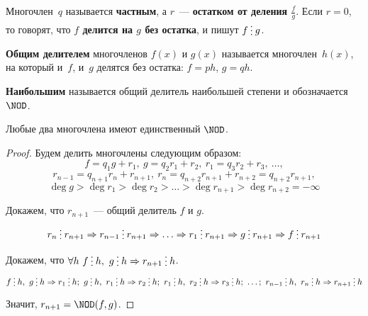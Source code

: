 Многочлен~$q$ называется \textbf{частным}, а $r$~--- \textbf{остатком от деления $\frac{f}g$}.
Если $r = 0$, то говорят, что \textbf{$f$ делится на $g$ без остатка}, и пишут $f \mult g$.

\textbf{Общим делителем} многочленов $f(x)$ и $g(x)$ называется многочлен~$h(x)$, на который и~$f$, и~$g$ делятся без остатка: $f = ph$, $g = qh$.

\textbf{Наибольшим} называется общий делитель наибольшей степени и обозначается $\NOD$.

\begin{theorem}
Любые два многочлена имеют единственный $\NOD$.
\end{theorem}
\begin{proof}
Будем делить многочлены следующим образом:
\begin{equation*}
f = q_1 g + r_1, \
g = q_2 r_1 + r_2, \
r_1 = q_3 r_2 + r_3, \ \ldots,
\end{equation*}
\begin{equation*}
r_{n-1} = q_{n+1} r_n + r_{n+1}, \
r_n = q_{n+2} r_{n+1} + r_{n+2} = q_{n+2} r_{n+1},
\end{equation*}
\begin{equation*}
\deg g > \deg r_1 > \deg r_2 > \ldots > \deg r_{n+1} > \deg r_{n+2} = -\infty
\end{equation*}

Докажем, что $r_{n+1}$~--- общий делитель $f$ и $g$.
\begin{equation*}
r_n \mult r_{n+1} \Rightarrow
r_{n-1} \mult r_{n+1} \Rightarrow
\ldots \Rightarrow
r_1 \mult r_{n+1} \Rightarrow
g \mult r_{n+1} \Rightarrow
f \mult r_{n+1}
\end{equation*}

Докажем, что $\forall h \ f \mult h, \ g \mult h \Rightarrow r_{n+1} \mult h$.
\begin{equation*}
f \mult h, \ g \mult h \Rightarrow r_1 \mult h; \
g \mult h, \ r_1 \mult h \Rightarrow r_2 \mult h; \
r_1 \mult h, \ r_2 \mult h \Rightarrow r_3 \mult h; \ \ldots; \
r_{n-1} \mult h, \ r_n \mult h \Rightarrow r_{n+1} \mult h
\end{equation*}

Значит, $r_{n+1} = \NOD(f, g)$.
\end{proof}